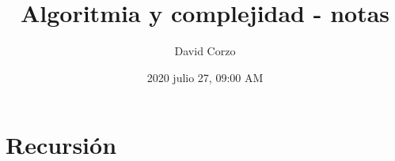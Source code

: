 \documentclass[openany]{book}
\title{Algoritmia y complejidad - notas}
\date{2020 julio 27, 09:00 AM}
\author{David Corzo} %
\begin{document}
\maketitle

\chapter{Recursión}





\end{document}
